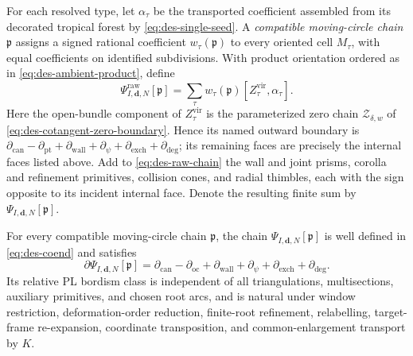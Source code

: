 For each resolved type, let $\alpha_\tau$ be the transported coefficient
assembled from its decorated tropical forest by
\eqref{eq:des-single-seed}.  A
\emph{compatible moving-circle chain} $\mathfrak p$ assigns a signed rational
coefficient $w_\tau(\mathfrak p)$ to every oriented cell $M_\tau$, with equal
coefficients on identified subdivisions.  With product orientation ordered
as in \eqref{eq:des-ambient-product}, define
\begin{equation}
 \Psi^{\mathrm{raw}}_{I,\mathbf d,N}[\mathfrak p]
 =\sum_\tau w_\tau(\mathfrak p)
   [Z_\tau^{\mathrm{vir}},\alpha_\tau].
 \label{eq:des-raw-chain}
\end{equation}
Here the open-bundle component of $Z_\tau^{\mathrm{vir}}$ is the
parameterized zero chain $\mathcal Z_{\delta,w}$ of
\eqref{eq:des-cotangent-zero-boundary}.  Hence its named outward boundary is
$\partial_{\mathrm{can}}-\partial_{\mathrm{pt}}
+\partial_{\mathrm{wall}}+\partial_{\psi}
+\partial_{\mathrm{exch}}+\partial_{\mathrm{deg}}$; its remaining faces are precisely
the internal faces listed above.  Add to \eqref{eq:des-raw-chain} the wall
and joint prisms, corolla and refinement primitives, collision cones, and
radial thimbles, each with the sign opposite to its incident internal face.
Denote the resulting finite sum by $\Psi_{I,\mathbf d,N}[\mathfrak p]$.

\begin{theorem}
\label{thm:des-absolute-boundary}
For every compatible moving-circle chain $\mathfrak p$, the chain
$\Psi_{I,\mathbf d,N}[\mathfrak p]$ is well defined in
\eqref{eq:des-coend} and satisfies
\begin{equation}
 \partial\Psi_{I,\mathbf d,N}[\mathfrak p]
 =\partial_{\mathrm{can}}-\partial_{\mathrm{oc}}
  +\partial_{\mathrm{wall}}+\partial_{\psi}
  +\partial_{\mathrm{exch}}+\partial_{\mathrm{deg}}.
 \label{eq:des-absolute-boundary}
\end{equation}
Its relative PL bordism class is independent of all triangulations,
multisections, auxiliary primitives, and chosen root arcs, and is natural under window
restriction, deformation-order reduction, finite-root refinement,
relabelling, target-frame re-expansion, coordinate transposition, and
common-enlargement transport by $K$.
\end{theorem}

